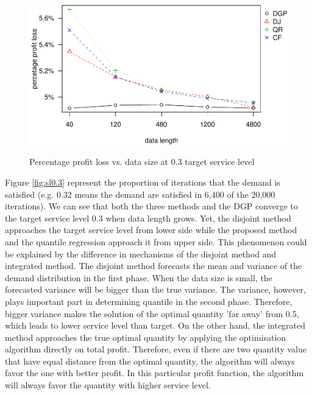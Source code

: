 \documentclass{article}
\begin{document}
\begin{figure}[ht]
\centering
\caption{Percentage profit loss vs. data size at 0.3 target service level}
\includegraphics{ppl0.3-1.pdf}
\label{fig:ppl0.3}
\end{figure}

Figure \ref{fig:sl0.3} represent the proportion of iterations that the demand is satisfied (e.g. 0.32 means the demand are satisfied in 6,400 of the 20,000 iterations). We can see that both the three methods and the DGP converge to the target service level 0.3 when data length grows. Yet, the disjoint method approaches the target service level from lower side while the proposed method and the quantile regression approach it from upper side. This phenomenon could be explained by the difference in mechanisms of the disjoint method and integrated method. The disjoint method forecasts the mean and variance of the demand distribution in the first phase. When the data size is small, the forecasted variance will be bigger than the true variance. The variance, however, plays important part in determining quantile in the second phase. Therefore, bigger variance makes the solution of the optimal quantity 'far away' from 0.5, which leads to lower service level than target. On the other hand, the integrated method approaches the true optimal quantity by applying the optimisation algorithm directly on total profit. Therefore, even if there are two quantity value that have equal distance from the optimal quantity, the algorithm will always favor the one with better profit. In this particular profit function, the algorithm will always favor the quantity with higher service level.
\end{document}
